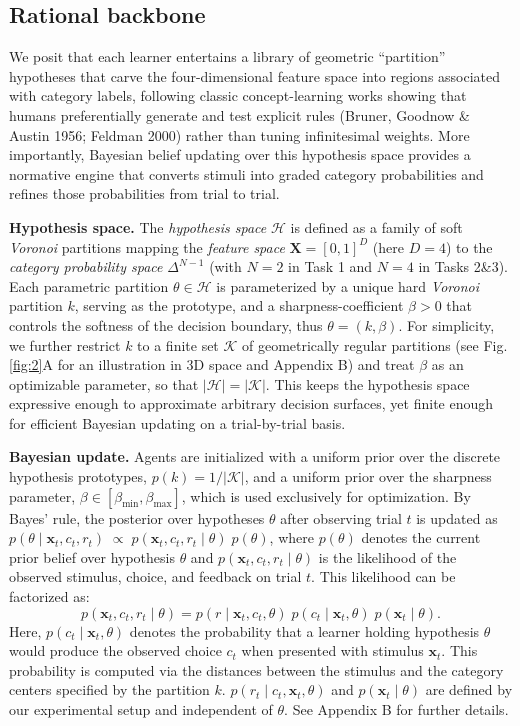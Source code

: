 \subsection{Rational backbone} \label{sec:3.1}

We posit that each learner entertains a library of geometric “partition” hypotheses that carve the four-dimensional feature space into regions associated with category labels, following classic concept-learning works showing that humans preferentially generate and test explicit rules (Bruner, Goodnow \& Austin 1956; Feldman 2000) rather than tuning infinitesimal weights. More importantly, Bayesian belief updating over this hypothesis space provides a normative engine that converts stimuli into graded category probabilities and refines those probabilities from trial to trial.

\textbf{Hypothesis space.} The \textit{hypothesis space} $\mathcal{H}$ is defined as a family of soft \textit{Voronoi} partitions mapping the \textit{feature space} $\mathbf X=[0,1]^D$ (here $D=4$) to the \textit{category probability space} $\Delta^{N-1}$ (with $N=2$ in Task 1 and $N=4$ in Tasks 2\&3). Each parametric partition $\theta \in \mathcal{H}$ is parameterized by a unique hard \textit{Voronoi} partition $k$, serving as the prototype, and a sharpness-coefficient $\beta>0$ that controls the softness of the decision boundary, thus $\theta=(k,\beta)$. For simplicity, we further restrict $k$ to a finite set $\mathcal{K}$ of geometrically regular partitions (see Fig. \ref{fig:2}A for an illustration in 3D space and Appendix B) and treat $\beta$ as an optimizable parameter, so that $|\mathcal{H}|=|\mathcal{K}|$. This keeps the hypothesis space expressive enough to approximate arbitrary decision surfaces, yet finite enough for efficient Bayesian updating on a trial-by-trial basis.
 
\textbf{Bayesian update.} Agents are initialized with a uniform prior over the discrete hypothesis prototypes, $p(k) = 1/|\mathcal{K}|$, and a uniform prior over the sharpness parameter, $\beta \in [\beta_{\min}, \beta_{\max}]$, which is used exclusively for optimization. By Bayes’ rule, the posterior over hypotheses $\theta$ after observing trial $t$ is updated as $p(\theta\mid\mathbf x_t,c_t,r_t)\;\propto\;p(\mathbf x_t,c_t,r_t\mid\theta)\;p(\theta)$, where $p(\theta)$ denotes the current prior belief over hypothesis $\theta$ and $p(\mathbf x_t,c_t,r_t\mid\theta)$ is the likelihood of the observed stimulus, choice, and feedback on trial $t$. This likelihood can be factorized as: 
\begin{equation}
    p(\mathbf{x}_t, c_t, r_t\mid\theta) = p(r \mid\mathbf{x}_t, c_t, \theta)\;p(c_t \mid\mathbf{x}_t, \theta)\;p(\mathbf{x}_t \mid\theta). \tag{1}
\end{equation}
Here, $p(c_t\mid\mathbf x_t,\theta)$ denotes the probability that a learner holding hypothesis $\theta$ would produce the observed choice $c_t$ when presented with stimulus $\mathbf x_t$. This probability is computed via the distances between the stimulus and the category centers specified by the partition $k$. $p(r_t \mid c_t, \mathbf{x}_t, \theta)$ and $p(\mathbf{x}_t \mid \theta)$ are defined by our experimental setup and independent of $\theta$. See Appendix B for further details.


